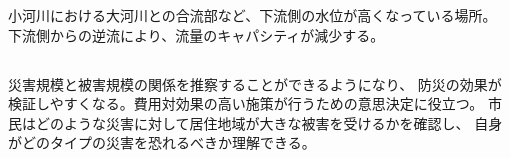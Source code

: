 \documentclass[a4paper]{jsarticle}
\begin{document}
\subsubsection{}
小河川における大河川との合流部など、下流側の水位が高くなっている場所。
下流側からの逆流により、流量のキャパシティが減少する。

\subsection{}
災害規模と被害規模の関係を推察することができるようになり、
防災の効果が検証しやすくなる。費用対効果の高い施策が行うための意思決定に役立つ。
市民はどのような災害に対して居住地域が大きな被害を受けるかを確認し、
自身がどのタイプの災害を恐れるべきか理解できる。

\section{}
\end{document}
